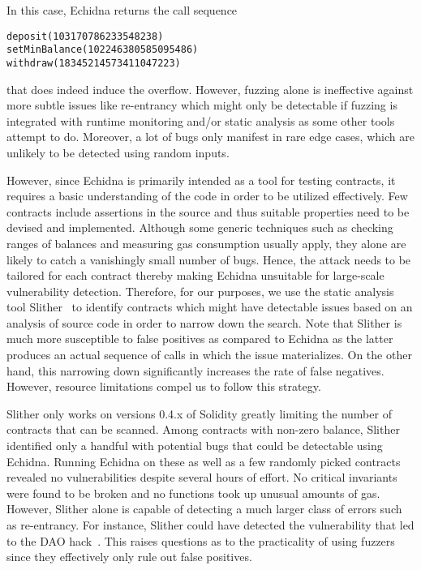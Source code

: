 In this case, Echidna returns the call sequence 
\begin{lstlisting}[basicstyle=\small]
deposit(103170786233548238)
setMinBalance(102246380585095486)
withdraw(18345214573411047223)
\end{lstlisting}
that does indeed induce the overflow. However, fuzzing alone is ineffective against more subtle issues like re-entrancy which might only be detectable if fuzzing is integrated with runtime monitoring and/or static analysis as some other tools attempt to do. Moreover, a lot of bugs only manifest in rare edge cases, which are unlikely to be detected using random inputs.

However, since Echidna is primarily intended as a tool for testing contracts, it requires a basic understanding of the code in order to be utilized effectively. Few contracts include assertions in the source and thus suitable properties need to be devised and implemented. Although some generic techniques such as checking ranges of balances and measuring gas consumption usually apply, they alone are likely to catch a vanishingly small number of bugs. Hence, the attack needs to be tailored for each contract thereby making Echidna unsuitable for large-scale vulnerability detection. Therefore, for our purposes, we use the static analysis tool Slither~\cite{slither} to identify contracts which might have detectable issues based on an analysis of source code in order to narrow down the search. Note that Slither is much more susceptible to false positives as compared to Echidna as the latter produces an actual sequence of calls in which the issue materializes. On the other hand, this narrowing down significantly increases the rate of false negatives. However, resource limitations compel us to follow this strategy.

Slither only works on versions 0.4.x of Solidity greatly limiting the number of contracts that can be scanned. Among contracts with non-zero balance, Slither identified only a handful with potential bugs that could be detectable using Echidna. Running Echidna on these as well as a few randomly picked contracts revealed no vulnerabilities despite several hours of effort. No critical invariants were found to be broken and no functions took up unusual amounts of gas. However, Slither alone is capable of detecting a much larger class of errors such as re-entrancy. For instance, Slither could have detected the vulnerability that led to the DAO hack~\cite{slither}. This raises questions as to the practicality of using fuzzers since they effectively only rule out false positives.
